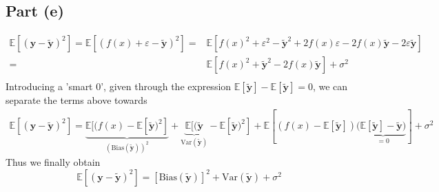 \subsection{Part (e)}

\begin{equation}
    \begin{split}
    \mathbb{E}\left[ (\boldsymbol{y} - \boldsymbol{\tilde{y}})^2\right] = 
    \mathbb{E}\left[ (f(x) + \varepsilon - \boldsymbol{\tilde{y}})^2\right]
    = & \mathbb{E}\left[f(x)^2 + \varepsilon^2 - \boldsymbol{\tilde{y}}^2
    + 2 f(x) \varepsilon - 2f(x) \boldsymbol{\tilde{y}} - 2 \varepsilon \boldsymbol{\tilde{y}}\right]\\
    = & \mathbb{E}\left[ f(x)^2 + \boldsymbol{\tilde{y}}^2  - 2 f(x)\boldsymbol{\tilde{y}}\right] + \sigma^2\\
    \end{split}
\end{equation}
Introducing a 'smart 0', given through the expression $\mathbb{E}[\boldsymbol{\tilde{y}}]- \mathbb{E}[\boldsymbol{\tilde{y}}]= 0$,
we can separate the terms above towards
\begin{equation}
    \begin{split}
        \mathbb{E}\left[ (\boldsymbol{y} - \boldsymbol{\tilde{y}})^2\right] =
        \underbrace{\mathbb{E}[(f(x)-\mathbb{E}[\boldsymbol{\tilde{y}})^2]}_{(\text{Bias}(\boldsymbol{\tilde{y}}))^2}
        + 
        \underbrace{\mathbb{E}[(\boldsymbol{\tilde{y}}}_{\text{Var}(\boldsymbol{\tilde{y}})} - \mathbb{E}[\boldsymbol{\tilde{y}})^2] + 
        \mathbb{E}[(f(x) - \mathbb{E}[\boldsymbol{\tilde{y}}])(\underbrace{\mathbb{E}[\boldsymbol{\tilde{y}}] - \boldsymbol{\tilde{y}})}_{=0}] + \sigma^2
    \end{split}
\end{equation}
Thus we finally obtain
\begin{equation}
    \mathbb{E}\left[ (\boldsymbol{y} - \boldsymbol{\tilde{y}})^2\right] =
    \left[\text{Bias}(\boldsymbol{\tilde{y}})\right]^2 + \text{Var}(\boldsymbol{\tilde{y}}) + \sigma^2
\end{equation}
